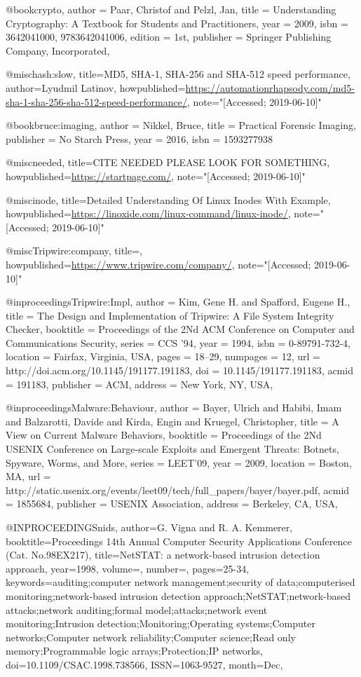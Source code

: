 @book{crypto,
 author = {Paar, Christof and Pelzl, Jan},
 title = {Understanding Cryptography: A Textbook for Students and Practitioners},
 year = {2009},
 isbn = {3642041000, 9783642041006},
 edition = {1st},
 publisher = {Springer Publishing Company, Incorporated},
}

@misc{hash:slow,
  title={{MD5, SHA-1, SHA-256 and SHA-512 speed performance}},
  author={Lyudmil Latinov},
  howpublished={\url{https://automationrhapsody.com/md5-sha-1-sha-256-sha-512-speed-performance/}},
  note="[Accessed; 2019-06-10]"
}

@book{bruce:imaging,
  author    = {Nikkel, Bruce}, 
  title     = {Practical Forensic Imaging},
  publisher = {No Starch Press},
  year      = 2016,
  isbn      = {1593277938}
}

@misc{needed,
  title={{CITE NEEDED PLEASE LOOK FOR SOMETHING}},
  howpublished={\url{https://startpage.com/}},
  note="[Accessed; 2019-06-10]"
}

@misc{inode,
  title={{Detailed Understanding Of Linux Inodes With Example}},
  howpublished={\url{https://linoxide.com/linux-command/linux-inode/}},
  note="[Accessed; 2019-06-10]"
}

@misc{Tripwire:company,
  title={{}},
  howpublished={\url{https://www.tripwire.com/company/}},
  note="[Accessed; 2019-06-10]"
}

@inproceedings{Tripwire:Impl,
 author = {Kim, Gene H. and Spafford, Eugene H.},
 title = {The Design and Implementation of Tripwire: A File System Integrity Checker},
 booktitle = {Proceedings of the 2Nd ACM Conference on Computer and Communications Security},
 series = {CCS '94},
 year = {1994},
 isbn = {0-89791-732-4},
 location = {Fairfax, Virginia, USA},
 pages = {18--29},
 numpages = {12},
 url = {http://doi.acm.org/10.1145/191177.191183},
 doi = {10.1145/191177.191183},
 acmid = {191183},
 publisher = {ACM},
 address = {New York, NY, USA},
} 


@inproceedings{Malware:Behaviour,
 author = {Bayer, Ulrich and Habibi, Imam and Balzarotti, Davide and Kirda, Engin and Kruegel, Christopher},
 title = {A View on Current Malware Behaviors},
 booktitle = {Proceedings of the 2Nd USENIX Conference on Large-scale Exploits and Emergent Threats: Botnets, Spyware, Worms, and More},
 series = {LEET'09},
 year = {2009},
 location = {Boston, MA},
 url = {http://static.usenix.org/events/leet09/tech/full_papers/bayer/bayer.pdf},
 acmid = {1855684},
 publisher = {USENIX Association},
 address = {Berkeley, CA, USA},
} 


@INPROCEEDINGS{nids,
author={G. {Vigna} and R. A. {Kemmerer}},
booktitle={Proceedings 14th Annual Computer Security Applications Conference (Cat. No.98EX217)},
title={NetSTAT: a network-based intrusion detection approach},
year={1998},
volume={},
number={},
pages={25-34},
keywords={auditing;computer network management;security of data;computerised monitoring;network-based intrusion detection approach;NetSTAT;network-based attacks;network auditing;formal model;attacks;network event monitoring;Intrusion detection;Monitoring;Operating systems;Computer networks;Computer network reliability;Computer science;Read only memory;Programmable logic arrays;Protection;IP networks},
doi={10.1109/CSAC.1998.738566},
ISSN={1063-9527},
month={Dec},}

